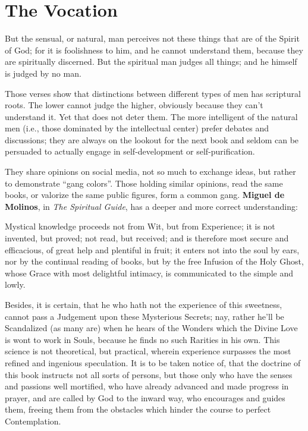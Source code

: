 \section{The Vocation}

\begin{quotex}
But the sensual, or natural, man perceives not these things that are of the Spirit of God; for it is foolishness to him, and he cannot understand them, because they are spiritually discerned. But the spiritual man judges all things; and he himself is judged by no man.
\end{quotex}


Those verses show that distinctions between different types of men has scriptural roots. The lower cannot judge the higher, obviously because they can't understand it. Yet that does not deter them. The more intelligent of the natural men (i.e., those dominated by the intellectual center) prefer debates and discussions; they are always on the lookout for the next book and seldom can be persuaded to actually engage in self-development or self-purification.

They share opinions on social media, not so much to exchange ideas, but rather to demonstrate ``gang colors''. Those holding similar opinions, read the same books, or valorize the same public figures, form a common gang. \textbf{Miguel de Molinos}, in \emph{The Spiritual Guide}, has a deeper and more correct understanding:

\begin{quotationx}
Mystical knowledge proceeds not from Wit, but from Experience; it is not invented, but proved; not read, but received; and is therefore most secure and efficacious, of great help and plentiful in fruit; it enters not into the soul by ears, nor by the continual reading of books, but by the free Infusion of the Holy Ghost, whose Grace with most delightful intimacy, is communicated to the simple and lowly.

Besides, it is certain, that he who hath not the experience of this sweetness, cannot pass a Judgement upon these Mysterious Secrets; nay, rather he'll be Scandalized (as many are) when he hears of the Wonders which the Divine Love is wont to work in Souls, because he finds no such Rarities in his own. This science is not theoretical, but practical, wherein experience surpasses the most refined and ingenious speculation. It is to be taken notice of, that the doctrine of this book instructs not all sorts of persons, but those only who have the senses and passions well mortified, who have already advanced and made progress in prayer, and are called by God to the inward way, who encourages and guides them, freeing them from the obstacles which hinder the course to perfect Contemplation.
\end{quotationx}


